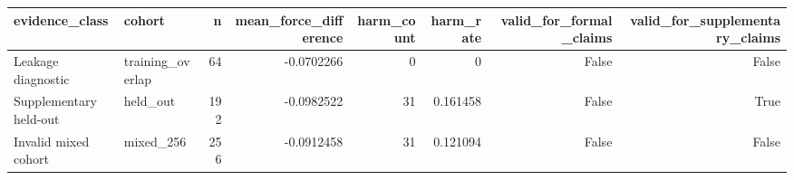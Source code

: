 \begin{tabular}{llrrrrrr}
\toprule
evidence_class & cohort & n & mean_force_difference & harm_count & harm_rate & valid_for_formal_claims & valid_for_supplementary_claims \\
\midrule
Leakage diagnostic & training_overlap & 64 & -0.0702266 & 0 & 0 & False & False \\
Supplementary held-out & held_out & 192 & -0.0982522 & 31 & 0.161458 & False & True \\
Invalid mixed cohort & mixed_256 & 256 & -0.0912458 & 31 & 0.121094 & False & False \\
\bottomrule
\end{tabular}
